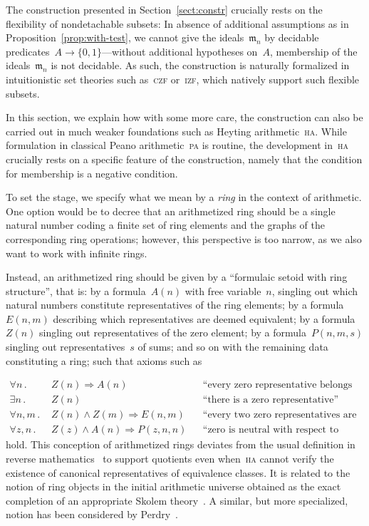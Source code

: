 \documentclass[com,11pt,crcready]{iosart2x}
\theoremstyle{definition}
\theoremstyle{plain}
\theoremstyle{remark}
\newcommand{\mmm}{\mathfrak{m}}
\renewcommand{\_}{\mathpunct{.}\,}
\begin{document}
The construction presented in Section~\ref{sect:constr} crucially rests on the
flexibility of nondetachable subsets: In absence of additional
assumptions as in Proposition~\ref{prop:with-test},
we cannot give the ideals~$\mmm_n$ by decidable
predicates~$A \to \{0,1\}$---without additional hypotheses on~$A$, membership of the
ideals~$\mmm_n$ is not decidable. As such, the construction is
naturally formalized in intuitionistic set theories such as~\textsc{czf}
or~\textsc{izf}, which natively support such flexible subsets.

In this section, we explain how with some more care, the construction can also
be carried out in much weaker foundations such as Heyting
arithmetic~\textsc{ha}. While formulation in classical Peano arithmetic~\textsc{pa}
is routine, the development in~\textsc{ha} crucially rests on a specific
feature of the construction, namely that the condition for membership is a
negative condition.

To set the stage, we specify what we mean by a \emph{ring} in the context of
arithmetic. One option would be to decree that an arithmetized ring should be a single
natural number coding a finite set of ring elements and the graphs of the
corresponding ring operations; however, this perspective is too narrow, as we
also want to work with infinite rings.

Instead, an arithmetized ring should be given by a ``formulaic setoid with ring
structure'', that is: by a formula~$A(n)$ with free
variable~$n$, singling out which natural numbers constitute
representatives of the ring elements; by a formula~$E(n,m)$ describing which
representatives are deemed equivalent; by a formula~$Z(n)$ singling out
representatives of the zero element; by a formula~$P(n,m,s)$ singling out
representatives~$s$ of sums; and so on with the remaining data constituting
a ring; such that axioms such as\par
{\vspace*{-1.2em}\small\begin{align*}
  \forall n\_ & Z(n) \Rightarrow A(n) && \text{``every zero representative belongs to the ring''} \\
  \exists n\_ & Z(n) && \text{``there is a zero representative''} \\
  \forall n,m\_ & Z(n) \wedge Z(m) \Longrightarrow E(n,m) && \text{``every two zero representatives are equivalent''} \\
  \forall z,n\_ & Z(z) \wedge A(n) \Longrightarrow P(z,n,n) && \text{``zero is neutral with respect to addition''}
\end{align*}}%
hold. This conception of arithmetized rings deviates from the usual definition
in reverse mathematics~\cite[Definition~III.5.1]{simpson:subsystems} to support
quotients even when~\textsc{ha} cannot verify the existence of
canonical representatives of equivalence classes. It is related to the notion
of ring objects in the initial arithmetic universe obtained as the exact
completion of an appropriate Skolem theory~\cite{maietti:au,vickers:sketches}.
A similar, but more specialized, notion has been considered by
Perdry~\cite[Section~2]{perdry:lazy}.
\end{document}
